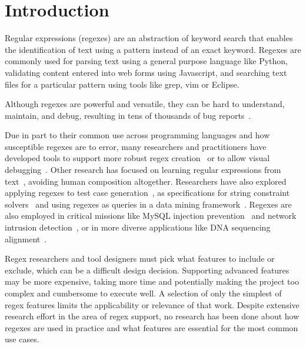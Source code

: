 \section{Introduction }

Regular expressions (regexes) are an abstraction of keyword search that enables the identification of text using a pattern instead of an exact keyword.
Regexes are commonly used for parsing text using a general purpose language like Python, validating content entered into web forms using Javascript, and searching text files for a particular pattern using tools like grep, vim or Eclipse.

Although regexes are powerful and versatile, they can be hard to understand,  maintain, and debug, resulting in tens of thousands of bug reports~\cite{Spishak:2012:TSR:2318202.2318207}.

Due in part to their common use across programming languages and how susceptible regexes are to error, many researchers and practitioners have developed tools to support more robust regex creation~\cite{Spishak:2012:TSR:2318202.2318207} or to allow visual debugging~\cite{Beck:2014:RVD:2591062.2591111}. Other research has focused on learning regular expressions from  text~\cite{Babbar:2010:CBA:1871840.1871848, Li:2008:REL:1613715.1613719}, avoiding human composition altogether.
Researchers have also explored applying regexes to test case generation~\cite{Ghosh:2013:JAT:2486788.2486925, Galler:2014:STD:2683035.2683100, Anand:2013:OSM:2503903.2503991, Tillmann:2014:TAT:2642937.2642941},
as specifications for string constraint solvers~\cite{Trinh:2014:SSS:2660267.2660372, hampi} and using regexes as queries in a data mining framework~\cite{Begel:2010:CDE:1806799.1806821}.
Regexes are also employed in critical missions like MySQL injection prevention~\cite{Yeole:2011:ADT:1980022.1980229} and network intrusion detection~\cite{network}, or in more diverse applications like DNA sequencing alignment~\cite{1594922}.

Regex researchers and tool designers must pick what features to include or exclude, which  can be a difficult  design decision. Supporting advanced features may be more expensive, taking more time and potentially making the project too complex and cumbersome to execute well.  A selection of only the simplest of regex features limits the applicability or relevance of that work. Despite extensive research effort in the area of regex support,  no research has been done about how regexes are used in practice and what features are essential for the most common use cases.


